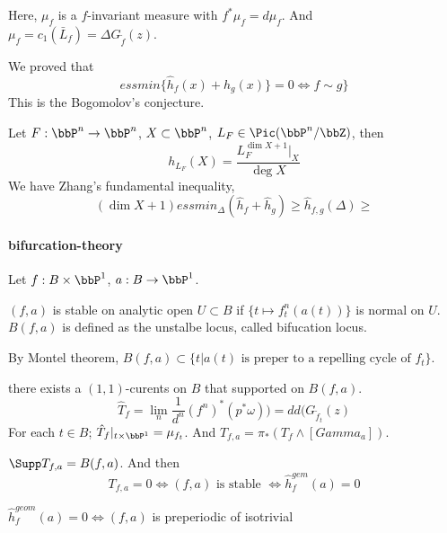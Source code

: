 Here, $\mu_f$ is a $f$-invariant measure with $f^*\mu_f = d\mu_f$.
And $\mu_f = c_1(\bar{L}_f) = \Delta G_{\tilde{f}}(z)$.

We proved that
\[ essmin \{\hat{h}_f(x) + \hat{h}_g(x)\} = 0 \iff f \sim g \} \]
This is the Bogomolov's conjecture.

Let $F: \bbP^n \to \bbP^n$, $X \subset \bbP^n$, $L_F \in \Pic(\bbP^n/\bbZ)$, then
\[ h_{L_F}(X) = \frac{L_F^{\dim X + 1}|_X}{\deg X} \]
We have Zhang's fundamental inequality,
\[ (\dim X + 1) essmin_{\Delta}(\hat{h}_f+\hat{h}_g) \geq \hat{h}_{f,g}(\Delta) \geq
\]

\paragraph{bifurcation-theory}
Let $f: B \times \bbP^1$, $a: B \to \bbP^1$.
\begin{definition}[label=\labelNFM{def:bifurcation-theory}, status=draft, tag=0000000]
	$(f,a)$ is stable on analytic open $U \subset B$ if $\{t \mapsto f_t^n(a(t))\}$ is normal on $U$.
	$B(f,a)$ is defined as the unstalbe locus, called bifucation locus.
\end{definition}

By Montel theorem, $B(f,a) \subset \{t | a(t) \text{ is preper to a repelling cycle of } f_t\}$.

there exists a $(1,1)$-curents on $B$ that supported on $B(f,a)$.
\[ \hat{T}_f = \lim_n \frac{1}{d^n} (f^n)^*(p^*\omega)) = dd(G_{\tilde{f}_t}(z) \]
For each $t \in B$; $\hat{T}_f |_{t \times \bbP^1} = \mu_{f_t}$.
And $T_{f,a} = \pi_*( T_{f} \wedge [Gamma_a])$.


\begin{theorem}[label=\labelNFM{thm:23}, status=draft, tag=0000000]
	$\Supp T_{f,a} = B(f,a)$.
	And then
	\[ T_{f,a} = 0 \iff (f,a) \text{ is stable } \iff \hat{h}_f^{gem}(a) =0 \]
\end{theorem}

\begin{theorem}[label=\labelNFM{thm:22}, status=draft, tag=0000000]
	$\hat{h}_f^{geom}(a) = 0 \iff (f,a)$ is preperiodic of isotrivial
\end{theorem}

































